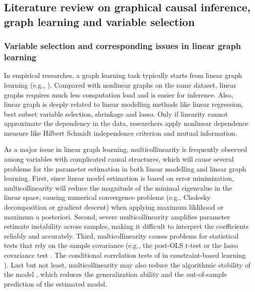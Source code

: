 \subsection{Literature review on graphical causal inference, graph learning and variable selection}

\subsubsection*{Variable selection and corresponding issues in linear graph learning}

In empirical researches, a graph learning task typically starts from linear graph learning (e.g., \citet{bollen1989structural, geiger1994learning, spirtes2000causation, friedman2008sparse}). Compared with nonlinear graphs on the same dataset, linear graphs requires much less computation load and is easier for inference. Also, linear graph is deeply related to linear modelling methods like linear regression, best subset variable selection, shrinkage and lasso. Only if linearity cannot approximate the dependency in the data, researchers apply nonlinear dependence measure like Hilbert Schmidt independence criterion \citep{gretton2005measuring} and mutual information.

As a major issue in linear graph learning, multicollinearity is frequently observed among variables with complicated causal structures, which will cause several problems for the parameter estimation in both linear modelling and linear graph learning. First, since linear model estimation is based on error minimization, multicollinearity will reduce the magnitude of the minimal eigenvalue in the linear space, causing numerical convergence problems (e.g., Cholesky decomposition or gradient descent) when applying maximum liklihood or maximum a posteriori. Second, severe multicollinearity amplifies parameter estimate instability across samples, making it difficult to interpret the coefficients reliably and accurately. Third, multicollinearity causes problems for statistical tests that rely on the sample covariance (e.g., the post-OLS t-test or the lasso covariance test \citep{lockhart2014significance}. The conditional correlation tests of in constraint-based learning \citep{farrar1967multicollinearity}). Last but not least, multicollinearity may also reduce the algorithmic stability of the model \citep{elisseeff2003leave}, which reduces the generalization ability and the out-of-sample prediction of the estimated model.

